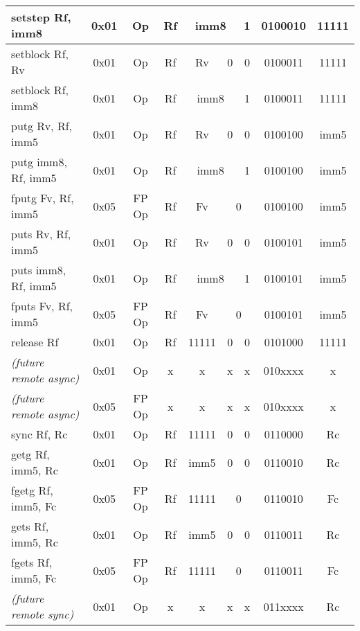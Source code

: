 \documentclass[a4paper,11pt]{article}
\begin{document}
\begin{table}
\begin{center}
{\begin{tabular}{|>{\ttfamily}l||c|c|c|c|c|c|c|c|}
setstep  Rf, imm8       & 0x01 & Op     & Rf & \multicolumn{2}{c|}{imm8} & 1 & 0100010 & 11111 \\ \cline{5-6}
setblock Rf, Rv         & 0x01 & Op     & Rf &                    Rv & 0 & 0 & 0100011 & 11111 \\ \cline{5-6}
setblock Rf, imm8       & 0x01 & Op     & Rf & \multicolumn{2}{c|}{imm8} & 1 & 0100011 & 11111 \\ \cline{5-6}
putg Rv, Rf, imm5       & 0x01 & Op     & Rf &                    Rv & 0 & 0 & 0100100 & imm5 \\ \cline{5-6}
putg imm8, Rf, imm5     & 0x01 & Op     & Rf & \multicolumn{2}{c|}{imm8} & 1 & 0100100 & imm5 \\ \cline{5-7}
fputg Fv, Rf, imm5      & 0x05 & FP Op  & Rf & Fv & \multicolumn{2}{c|}{0} & 0100100 & imm5 \\ \cline{5-7}
puts Rv, Rf, imm5       & 0x01 & Op     & Rf &                    Rv & 0 & 0 & 0100101 & imm5 \\ \cline{5-6}
puts imm8, Rf, imm5     & 0x01 & Op     & Rf & \multicolumn{2}{c|}{imm8} & 1 & 0100101 & imm5 \\ \cline{5-7}
fputs Fv, Rf, imm5      & 0x05 & FP Op  & Rf & Fv & \multicolumn{2}{c|}{0} & 0100101 & imm5 \\ \cline{6-7}
release  Rf             & 0x01 & Op     & Rf &                    11111 & 0 & 0 & 0101000 & 11111 \\
\hline\hline
\normalfont \emph{(future remote async)} & 0x01 & Op & x & x & x & x & 010xxxx & x \\
\normalfont \emph{(future remote async)} & 0x05 & FP Op & x & x & x & x & 010xxxx & x \\
\hline \hline
sync Rf, Rc             & 0x01 & Op     & Rf &                    11111 & 0 & 0 & 0110000 & Rc \\
getg Rf, imm5, Rc       & 0x01 & Op     & Rf &                  imm5 & 0 & 0 & 0110010 & Rc \\ \cline{6-7}
fgetg  Rf, imm5, Fc     & 0x05 & FP Op  & Rf & 11111 & \multicolumn{2}{c|}{0} &   0110010 & Fc \\ \cline{6-7}
gets Rf, imm5, Rc       & 0x01 & Op     & Rf &                  imm5 & 0 & 0 & 0110011 & Rc \\ \cline{6-7}
fgets  Rf, imm5, Fc     & 0x05 & FP Op  & Rf & 11111 & \multicolumn{2}{c|}{0} &   0110011 & Fc \\ \cline{6-7}
\hline\hline
\normalfont \emph{(future remote sync)} & 0x01 & Op & x & x & x & x & 011xxxx & Rc \\

\end{tabular}}
\end{center}
\end{table}
\end{document}
